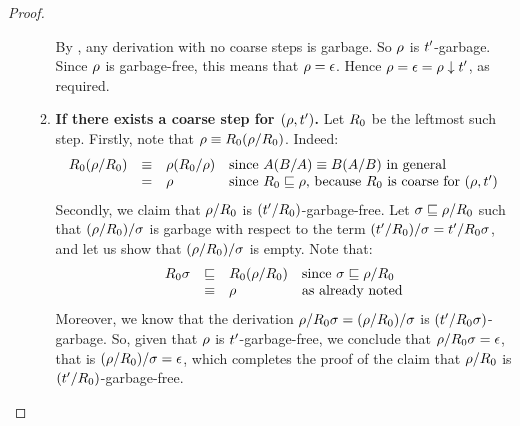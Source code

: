 \begin{proof}
\begin{itemize}
\begin{enumerate}
    By , any derivation with no coarse steps is garbage.
    So $\rho$ is $t'$-garbage.
    Since $\rho$ is garbage-free, this means that $\rho = \epsilon$.
    Hence $\rho = \epsilon = \rho \downarrow t'$, as required.
  \item {\bf If there exists a coarse step for $(\rho,t')$.}
    Let $R_0$ be the leftmost such step.
    Firstly, note that $\rho \equiv R_0(\rho/R_0)$. Indeed:
    \[
      \begin{array}{rcll}
      R_0(\rho/R_0)
      & \equiv & \rho(R_0/\rho)  & \text{since $A(B/A) \equiv B(A/B)$ in general} \\
      & = & \rho                          & \text{since $R_0 \sqsubseteq \rho$, because $R_0$ is coarse for $(\rho,t')$} \\
      \end{array}
    \]
    Secondly, we claim that $\rho/R_0$ is $(t'/R_0)$-garbage-free.
    Let $\sigma \sqsubseteq \rho/R_0$ such that $(\rho/R_0)/\sigma$ is garbage
    with respect to the term $(t'/R_0)/\sigma = t'/R_0\sigma$,
    and let us show that $(\rho/R_0)/\sigma$ is empty.
    Note that:
    \[
      \begin{array}{rcll}
      R_0\sigma
      & \sqsubseteq & R_0(\rho/R_0) & \text{since $\sigma \sqsubseteq \rho/R_0$} \\
      & \equiv & \rho                    & \text{as already noted} \\
      \end{array}
    \]
    Moreover, we know that the derivation $\rho/R_0\sigma = (\rho/R_0)/\sigma$ is
    $(t'/R_0\sigma)$-garbage.
    So, given that $\rho$ is $t'$-garbage-free, we conclude that
    $\rho/R_0\sigma = \epsilon$, that is $(\rho/R_0)/\sigma = \epsilon$,
    which completes the proof of the claim that $\rho/R_0$ is $(t'/R_0)$-garbage-free.


\end{enumerate}
\end{itemize}
\end{proof}
